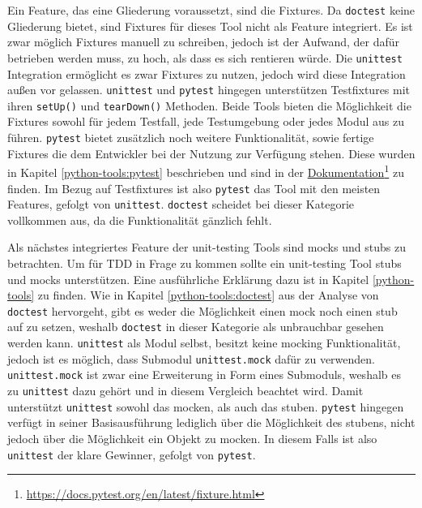 Ein Feature, das eine Gliederung voraussetzt, sind die Fixtures. Da
\lstinline{doctest} keine Gliederung bietet, sind Fixtures für dieses Tool
nicht als Feature integriert. Es ist zwar möglich Fixtures manuell zu
schreiben, jedoch ist der Aufwand, der dafür betrieben werden muss, zu hoch, als
dass es sich rentieren würde. Die \lstinline{unittest} Integration ermöglicht es
zwar Fixtures zu nutzen, jedoch wird diese Integration außen vor
gelassen. \lstinline{unittest} und \lstinline{pytest} hingegen unterstützen
Testfixtures mit ihren \lstinline{setUp()} und \lstinline{tearDown()} Methoden.
Beide Tools bieten die Möglichkeit die Fixtures sowohl für jedem Testfall, jede
Testumgebung oder jedes Modul aus zu führen. \lstinline{pytest} bietet
zusätzlich noch weitere Funktionalität, sowie fertige Fixtures die dem
Entwickler bei der Nutzung zur Verfügung stehen. Diese wurden in Kapitel
\ref{python-tools:pytest} beschrieben und sind in der 
\href{https://docs.pytest.org/en/latest/fixture.html}{Dokumentation}\footnote{\url{https://docs.pytest.org/en/latest/fixture.html}}
zu finden. Im Bezug auf Testfixtures ist also \lstinline{pytest} das Tool
mit den meisten Features, gefolgt von \lstinline{unittest}. \lstinline{doctest}
scheidet bei dieser Kategorie vollkommen aus, da die Funktionalität gänzlich
fehlt.

Als nächstes integriertes Feature der unit-testing Tools sind \Glspl{mock} und
\Glspl{stub} zu betrachten. Um für TDD in Frage zu kommen sollte ein
unit-testing Tool \Glspl{stub} und \Glspl{mock} unterstützen. Eine ausführliche
Erklärung dazu ist in Kapitel \ref{python-tools} zu finden. Wie in Kapitel
\ref{python-tools:doctest} aus der Analyse von \lstinline{doctest} hervorgeht,
gibt es weder die Möglichkeit einen \Gls{mock} noch einen \Gls{stub} auf zu
setzen, weshalb \lstinline{doctest} in dieser Kategorie als unbrauchbar gesehen
werden kann. \lstinline{unittest} als Modul selbst, besitzt keine \gls{mock}ing
Funktionalität, jedoch ist es möglich, dass Submodul \lstinline{unittest.mock}
dafür zu verwenden. \lstinline{unittest.mock} ist zwar eine Erweiterung in Form 
eines Submoduls, weshalb es zu \lstinline{unittest} dazu gehört und in diesem 
Vergleich beachtet wird. Damit unterstützt \lstinline{unittest} sowohl das 
\Gls{mock}en, als auch das \Gls{stub}en. \lstinline{pytest} hingegen verfügt in 
seiner Basisausführung lediglich über die Möglichkeit des \Gls{stub}ens, nicht 
jedoch über die Möglichkeit ein Objekt zu \gls{mock}en. In diesem Falls ist 
also \lstinline{unittest} der klare Gewinner, gefolgt von \lstinline{pytest}.
\newline


